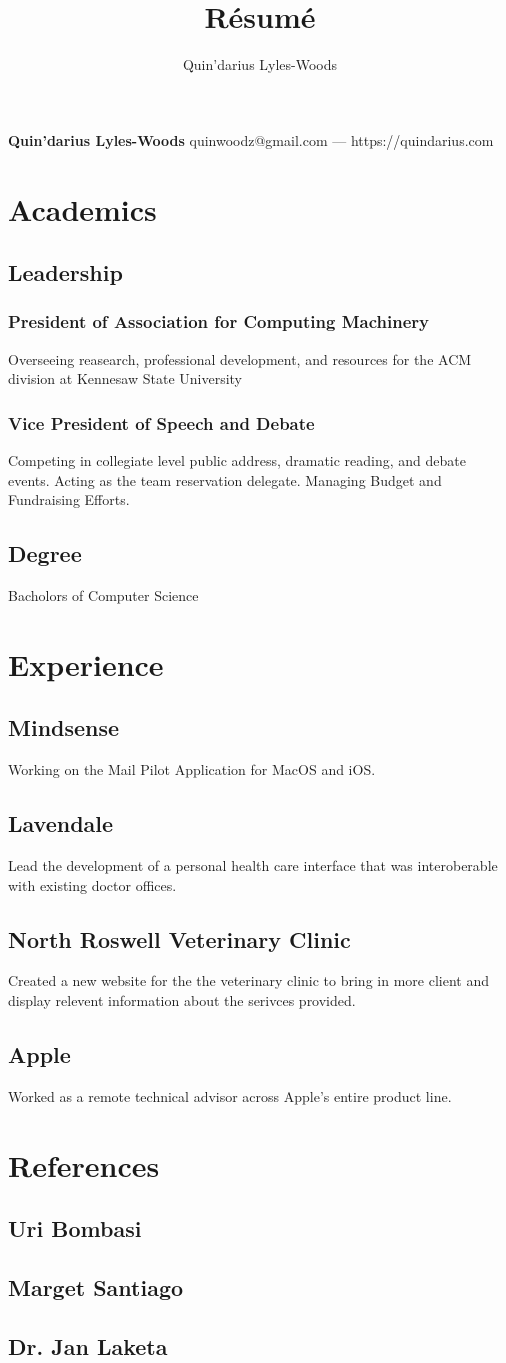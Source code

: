 \documentclass{article}
\makeatletter
\renewcommand{\maketitle}
{
\begin{center}
{\huge\bfseries
Quin'darius Lyles-Woods
}
\vspace{.25em}
quinwoodz@gmail.com --- https://quindarius.com
\end{center}
}
\makeatother
\begin{document}
\title{R\'esum\'e}
\author{Quin'darius Lyles-Woods}
\maketitle

\section{Academics}
\subsection{Leadership}
\subsubsection{President of Association for Computing Machinery}
Overseeing reasearch, professional development, and resources for the ACM division at Kennesaw State University
\subsubsection{Vice President of Speech and Debate}
Competing in collegiate level public address, dramatic reading, and debate events.
Acting as the team reservation delegate.
Managing Budget and Fundraising Efforts.
\subsection{Degree}
Bacholors of Computer Science
\section{Experience}
\subsection{Mindsense}
Working on the Mail Pilot Application for MacOS and iOS.
\subsection{Lavendale}
Lead the development of a personal health care interface that was interoberable with existing doctor offices.
\subsection{North Roswell Veterinary Clinic}
Created a new website for the the veterinary clinic to bring in more client and display relevent information about the serivces provided.
\subsection{Apple}
Worked as a remote technical advisor across Apple's entire product line.
\section{References}
\subsection{Uri Bombasi}
\subsection{Marget Santiago}
\subsection{Dr. Jan Laketa}
\end{document}
